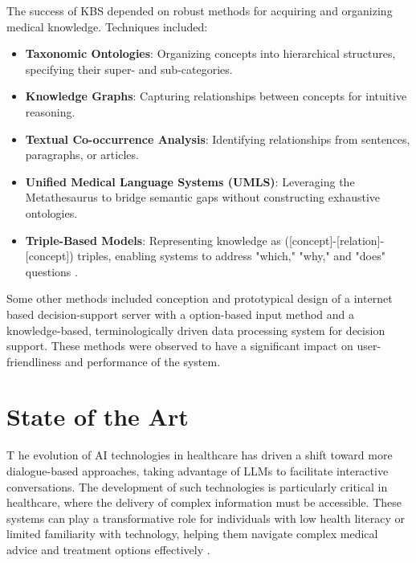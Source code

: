 \noindent The success of KBS depended on robust methods for acquiring and organizing medical knowledge. Techniques included:
\begin{itemize}
    \item \textcolor{TUMRed}{\textbf{Taxonomic Ontologies}}: Organizing concepts into hierarchical structures, specifying their super- and sub-categories.
    \item \textcolor{TUMRed}{\textbf{Knowledge Graphs}}: Capturing relationships between concepts for intuitive reasoning.
    \item \textcolor{TUMRed}{\textbf{Textual Co-occurrence Analysis}}: Identifying relationships from sentences, paragraphs, or articles.
    \item \textcolor{TUMRed}{\textbf{Unified Medical Language Systems (UMLS)}}: Leveraging the Metathesaurus to bridge semantic gaps without constructing exhaustive ontologies.
    \item \textcolor{TUMRed}{\textbf{Triple-Based Models}}: Representing knowledge as ([concept]-[relation]-[concept]) triples, enabling systems to address "which," "why," and "does" questions \cite{demner2009can}.
\end{itemize}

\noindent Some other methods included conception and prototypical design of a internet based decision-support server \cite{eich1999internet} with a option-based input method and a knowledge-based, terminologically driven data processing system for decision support. These methods were observed to have a significant impact on user-friendliness and performance of the system.

\section{State of the Art}
\lettrine{T}{ }he evolution of AI technologies in healthcare has driven a shift toward more dialogue-based approaches, taking advantage of LLMs to facilitate interactive conversations. The development of such technologies is particularly critical in healthcare, where the delivery of complex information must be accessible. These systems can play a transformative role for individuals with low health literacy or limited familiarity with technology, helping them navigate complex medical advice and treatment options effectively \cite{cohen2022intelligent}.\\[\baselineskip]

